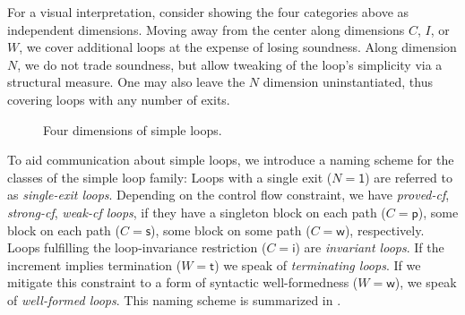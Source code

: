 For a visual interpretation, consider  showing the four categories above as independent dimensions. Moving away from the center along dimensions $C$, $I$, or $W$, we cover additional loops at the expense of losing soundness. Along dimension $N$, we do not trade soundness, but allow tweaking of the loop's simplicity via a structural measure. One may also leave the $N$ dimension uninstantiated, thus covering loops with any number of exits.

\begin{figure}
\caption{Four dimensions of simple loops.}
\label{fig:simpleloopdim}
\end{figure}

To aid communication about simple loops, we introduce a naming scheme for the classes of the simple loop family: Loops with a single exit ($N = \textsf{1}$) are referred to as \emph{single-exit loops}. Depending on the control flow constraint, we have \emph{proved-cf}, \emph{strong-cf}, \emph{weak-cf loops}, if they have a singleton block on each path ($C = \textsf{p}$), some block on each path ($C = \textsf{s}$), some block on some path ($C = \textsf{w}$), respectively. Loops fulfilling the loop-invariance restriction ($C = \textsf{i}$) are \emph{invariant loops}. If the increment implies termination ($W = \textsf{t}$) we speak of \emph{terminating loops}. If we mitigate this constraint to a form of syntactic well-formedness ($W = \textsf{w}$), we speak of \emph{well-formed loops}. This naming scheme is summarized in .

